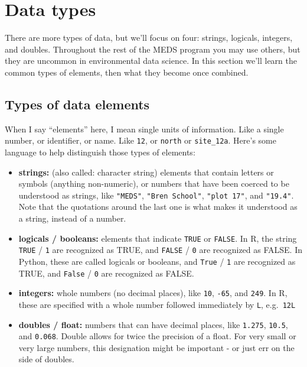 \documentclass[
]{book}
\begin{document}
\hypertarget{data-types}{%
\section{Data types}\label{data-types}}

There are more types of data, but we'll focus on four: strings, logicals, integers, and doubles. Throughout the rest of the MEDS program you may use others, but they are uncommon in environmental data science. In this section we'll learn the common types of elements, then what they become once combined.

\hypertarget{types-of-data-elements}{%
\subsection{Types of data elements}\label{types-of-data-elements}}

When I say ``elements'' here, I mean single units of information. Like a single number, or identifier, or name. Like \texttt{12}, or \texttt{north} or \texttt{site\_12a}. Here's some language to help distinguish those types of elements:

\begin{itemize}
\item
  \textbf{strings:} (also called: character string) elements that contain letters or symbols (anything non-numeric), or numbers that have been coerced to be understood as strings, like \texttt{"MEDS"}, \texttt{"Bren\ School"}, \texttt{"plot\ 17"}, and \texttt{"19.4"}. Note that the quotations around the last one is what makes it understood as a string, instead of a number.
\item
  \textbf{logicals / booleans:} elements that indicate \texttt{TRUE} or \texttt{FALSE}. In R, the string \texttt{TRUE} / \texttt{1} are recognized as TRUE, and \texttt{FALSE} / \texttt{0} are recognized as FALSE. In Python, these are called logicals or booleans, and \texttt{True} / \texttt{1} are recognized as TRUE, and \texttt{False} / \texttt{0} are recognized as FALSE.
\item
  \textbf{integers:} whole numbers (no decimal places), like \texttt{10}, \texttt{-65}, and \texttt{249}. In R, these are specified with a whole number followed immediately by \texttt{L}, e.g.~\texttt{12L}
\item
  \textbf{doubles / float:} numbers that can have decimal places, like \texttt{1.275}, \texttt{10.5}, and \texttt{0.068}. Double allows for twice the precision of a float. For very small or very large numbers, this designation might be important - or just err on the side of doubles.
\end{itemize}
\end{document}
